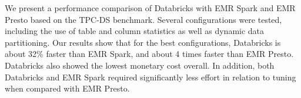 We present a performance comparison of Databricks with EMR Spark and EMR Presto based on the TPC-DS benchmark.
Several configurations were tested, including the use of table and column statistics as well as dynamic data partitioning.
Our results show that for the best configurations, Databricks is about 32\% faster than EMR Spark, and about 4 times
faster than EMR Presto. Databricks also showed the lowest monetary cost overall. In addition, both Databricks and EMR Spark
required significantly less effort in relation to tuning when compared with EMR Presto.


